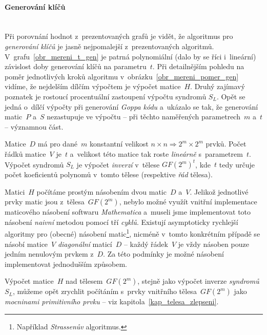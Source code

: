 \documentclass[thesis=M,czech,hidelinks]{FITthesis}[2012/06/26]
\newcommand{\0}{{\textcolor[gray]{0.75}{0}}}
\begin{document}
\paragraph{Generování klíčů} \hfill \\
Při porovnání hodnot z~prezentovaných grafů je vidět, že algoritmus pro
\emph{generování klíčů} je jasně nejpomalejší z~prezentovaných algoritmů.
V~grafu~\ref{obr_mereni_t_gen} je patrná polynomiální (dalo by se říci
i~lineární) závislost doby generování klíčů na parametru~$t$. Při detailnějším
pohledu na poměr jednotlivých kroků algoritmu
v~obrázku~\ref{obr_mereni_pomer_gen} vidíme, že nejdelším dílčím výpočtem je
výpočet matice~$H$. Druhý zajímavý poznatek je rostoucí procentuální zastoupení
výpočtu syndromů $S_L$. Opět se jedná o~dílčí výpočty při generování \emph{Goppa
kódu} a~ukázalo se tak, že generování matic~$P$ a~$S$ nezastupuje ve výpočtu --
při těchto naměřených parametrech~$m$ a~$t$ -- významnou část.

Matice~$D$ má pro dané~$m$ konstantní velikost $n \times n \Rightarrow 2^m
\times 2^m$ prvků. Počet řádků matice~$V$ je~$t$ a~velikost této matice tak
roste \emph{lineárně} s~parametrem~$t$. Výpočet syndromů $S_L$ je výpočet
\emph{inverzí} v~tělese $GF(2^m)^t$, kde~$t$ tedy určuje počet koeficientů
polynomů v~tomto tělese (respektive \emph{řád} tělesa).

Matici~$H$ počítáme prostým násobením dvou matic~$D$ a~$V$. Jelikož jednotlivé
prvky matic jsou z~tělesa~$GF(2^m)$, nebylo možné využít vnitřní implementace
maticového násobení softwaru \emph{Mathematica} a~museli jsme implementovat toto
násobení \emph{naivní} metodou pomocí tří \emph{cyklů}. Existují asymptoticky
rychlejší algoritmy pro (obecné) násobení matic\footnote{
    Například \emph{Strassenův} algoritmus.
}, nicméně v~tomto konkrétním případě se násobí matice~$V$ \emph{diagonální}
maticí~$D$ -- každý řádek~$V$ je vždy násoben pouze jedním nenulovým prvkem
z~$D$. Za této podmínky je možné násobení implementovat jednodušším způsobem.

Výpočet matice~$H$ nad tělesem~$GF(2^m)$, stejně jako výpočet inverze
\emph{syndromů}~$S_L$, můžeme opět zrychlit počítáním s~prvky
vnitřního tělesa~$GF(2^m)$ jako \emph{mocninami primitivního prvku} -- viz
kapitola~\ref{kap_telesa_zlepseni}.
\end{document}
